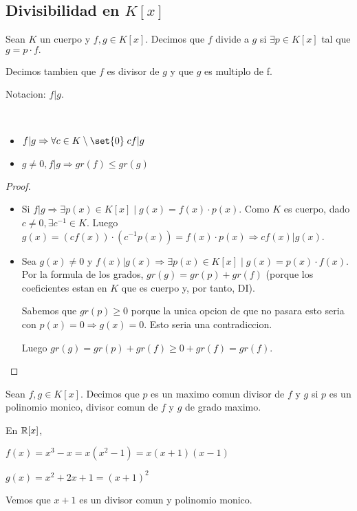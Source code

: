 \subsection{Divisibilidad en \(K[x ]\)}
\begin{definition}
	Sean \(K \) un cuerpo y \(f,g \in K[x ]\). Decimos que \(f \) divide a \(g \) si \(\exists p \in  K[x ]\) tal que \(g = p \cdot f. \)
	
	Decimos tambien que \( f \) es divisor de \(g \) y que \(g \) es multiplo de f.
	
	Notacion: \(f | g \).
\end{definition}
\begin{proposition}
	~\begin{itemize}
		\item \(f | g \Rightarrow \forall c \in K \setminus \set{0} \; cf | g \)
		\item \(g \neq 0, f|g \Rightarrow gr(f) \leq gr(g )\)
	\end{itemize}
\end{proposition}
\begin{proof}
	\begin{itemize}
		\item Si \(f |g \Rightarrow \exists p(x) \in K[x ] \mid g(x) = f(x) \cdot p(x) \). Como \(K \) es cuerpo, dado \(c \neq 0, \exists c^{-1} \in K \). Luego \(g(x) = (cf(x)) \cdot (c^{-1} p(x)) = f(x) \cdot p(x)\Rightarrow cf(x) | g(x )\).
		\item Sea \(g(x) \neq 0 \) y \(f(x) | g(x ) \Rightarrow \exists p(x) \in K[x ] \mid g(x) = p(x) \cdot f(x) \). Por la formula de los grados, \(gr(g) = gr(p) + gr(f )\) (porque los coeficientes estan en \(K \) que es cuerpo y, por tanto, DI).
		      
		      Sabemos que \(gr(p) \geq 0 \) porque la unica opcion de que no pasara esto seria con \(p(x) = 0 \Rightarrow g(x) = 0 \). Esto seria una contradiccion.
		      
		      Luego \(gr(g) = gr(p) + gr(f) \geq 0 + gr(f) = gr(f )\).
	\end{itemize}
\end{proof}
\begin{definition}
	Sean \(f,g \in K[x ]\). Decimos que \(p \) es un maximo comun divisor de \(f \) y \(g \) si \(p \) es un polinomio monico, divisor comun de \(f \) y \(g \) de grado maximo.
\end{definition}
\begin{example}
	En \(\mathbb{R}[x ]\),
	
	\(f(x) = x^{3} - x = x(x^{2}-1 ) = x(x+1)(x-1) \)
	
	\(g(x) = x^{2} + 2x + 1 = (x+1)^{2 } \)
	
	Vemos que \(x + 1 \) es un divisor comun y polinomio monico.
\end{example}

